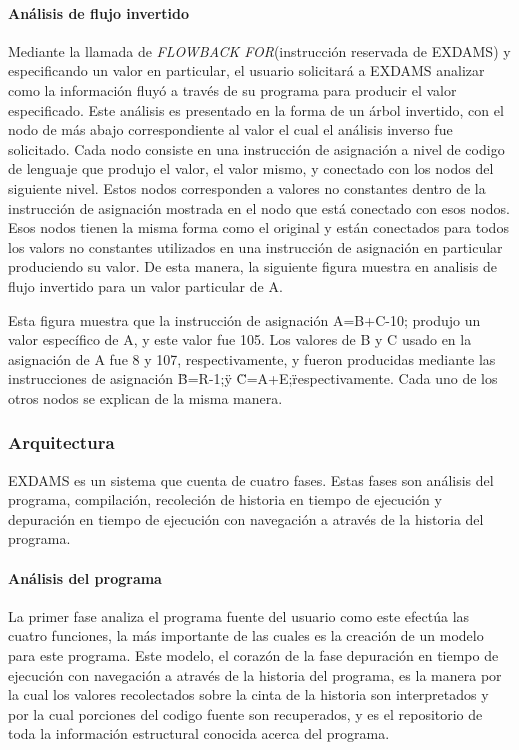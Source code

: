 \documentclass[12pt,legalpaper]{report}
\begin{document}
			\paragraph[Análisis de flujo]{Análisis de flujo invertido}

Mediante la llamada de \textit{FLOWBACK FOR}(instrucción reservada de EXDAMS) y especificando un valor en particular, el usuario solicitará a EXDAMS analizar como la información fluyó a través de su programa para producir el valor especificado.  Este análisis es presentado en la forma de un árbol invertido, con el nodo de más abajo correspondiente al valor el cual el análisis inverso fue solicitado.  Cada nodo consiste en una instrucción de asignación a nivel de codigo de lenguaje que produjo el valor, el valor mismo, y conectado con los nodos del siguiente nivel.  Estos nodos corresponden a valores no constantes dentro de la instrucción de asignación mostrada en el nodo que está conectado con esos nodos.  Esos nodos tienen la misma forma como el original y están conectados para todos los valors no constantes utilizados en una instrucción de asignación en particular produciendo su valor.  De esta manera, la siguiente figura muestra en analisis de flujo invertido para un valor particular de A. 

Esta figura muestra que la instrucción de asignación A=B+C-10; produjo un valor específico de A, y este valor fue 105.  Los valores de B y C usado en la asignación de A fue 8 y 107, respectivamente, y fueron producidas mediante las instrucciones de asignación \"B=R-1;\" y \"C=A+E;\" respectivamente.  Cada uno de los otros nodos se explican de la misma manera.

			\subsubsection{Arquitectura}

EXDAMS es un sistema que cuenta de cuatro fases.  Estas fases son análisis del programa, compilación, recoleción de historia en tiempo de ejecución y depuración en tiempo de ejecución con navegación a através de la historia del programa.

				\paragraph{Análisis del programa}

La primer fase analiza el programa fuente del usuario como este efectúa las cuatro funciones, la más importante de las cuales es la creación de un modelo para este programa.  Este modelo, el corazón de la fase depuración en tiempo de ejecución con navegación a através de la historia del programa, es la manera por la cual los valores recolectados sobre la cinta de la historia son interpretados y por la cual porciones del codigo fuente son recuperados, y es el repositorio de toda la información estructural conocida acerca del programa.
\end{document}
